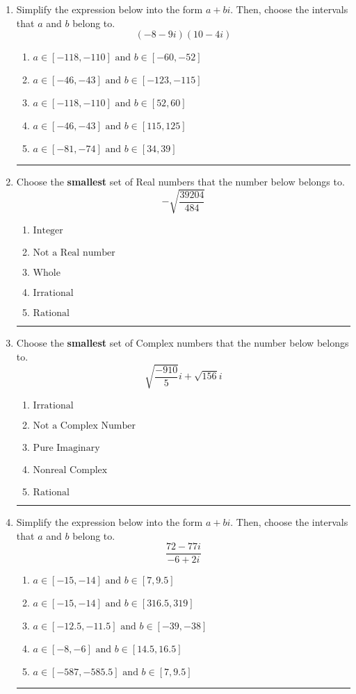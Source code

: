 \documentclass[14pt]{extbook}
\newcommand{\litem}[1]{\item#1\hspace*{-1cm}\rule{\textwidth}{0.4pt}}
\begin{document}
\begin{enumerate}
{\begin{enumerate}[label=\Alph*.]
\end{enumerate} }
\litem{
Simplify the expression below into the form $a+bi$. Then, choose the intervals that $a$ and $b$ belong to.\[ (-8 - 9 i)(10 - 4 i) \]\begin{enumerate}[label=\Alph*.]
\item \( a \in [-118, -110] \text{ and } b \in [-60, -52] \)
\item \( a \in [-46, -43] \text{ and } b \in [-123, -115] \)
\item \( a \in [-118, -110] \text{ and } b \in [52, 60] \)
\item \( a \in [-46, -43] \text{ and } b \in [115, 125] \)
\item \( a \in [-81, -74] \text{ and } b \in [34, 39] \)

\end{enumerate} }
\litem{
Choose the \textbf{smallest} set of Real numbers that the number below belongs to.\[ -\sqrt{\frac{39204}{484}} \]\begin{enumerate}[label=\Alph*.]
\item \( \text{Integer} \)
\item \( \text{Not a Real number} \)
\item \( \text{Whole} \)
\item \( \text{Irrational} \)
\item \( \text{Rational} \)

\end{enumerate} }
\litem{
Choose the \textbf{smallest} set of Complex numbers that the number below belongs to.\[ \sqrt{\frac{-910}{5}} i+\sqrt{156}i \]\begin{enumerate}[label=\Alph*.]
\item \( \text{Irrational} \)
\item \( \text{Not a Complex Number} \)
\item \( \text{Pure Imaginary} \)
\item \( \text{Nonreal Complex} \)
\item \( \text{Rational} \)

\end{enumerate} }
\litem{
Simplify the expression below into the form $a+bi$. Then, choose the intervals that $a$ and $b$ belong to.\[ \frac{72 - 77 i}{-6 + 2 i} \]\begin{enumerate}[label=\Alph*.]
\item \( a \in [-15, -14] \text{ and } b \in [7, 9.5] \)
\item \( a \in [-15, -14] \text{ and } b \in [316.5, 319] \)
\item \( a \in [-12.5, -11.5] \text{ and } b \in [-39, -38] \)
\item \( a \in [-8, -6] \text{ and } b \in [14.5, 16.5] \)
\item \( a \in [-587, -585.5] \text{ and } b \in [7, 9.5] \)


\end{enumerate}}
\end{enumerate}
\end{document}
